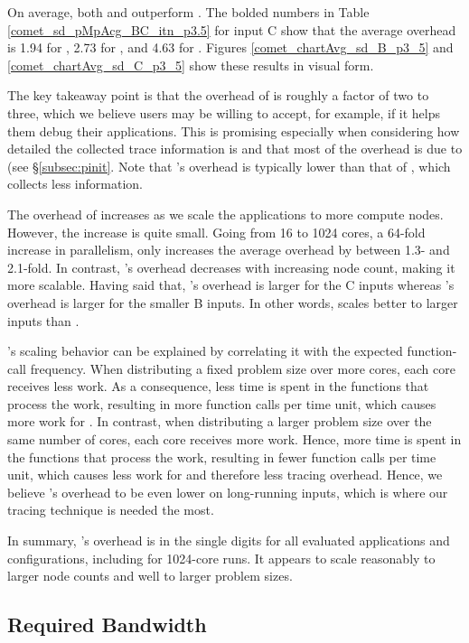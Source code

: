 On average, both \parlotm and \parlota outperform \callgrind. The bolded numbers in Table \ref{comet_sd_pMpAcg_BC_itn_p3.5} for input C show that the average overhead is 1.94 for \parlotm, 2.73 for \parlota, and 4.63 for \callgrind. Figures \ref{comet_chartAvg_sd_B_p3_5} and \ref{comet_chartAvg_sd_C_p3_5} show these results in visual form.


The key takeaway point is that the overhead of \parlot is roughly a factor of two to three, which we believe users may be willing to accept, for example, if it helps them debug their applications. This is promising especially when considering how detailed the collected trace information is and that most of the overhead is due to \pin (see \S\ref{subsec:pinit}. Note that \parlot 's overhead is typically lower than that of \callgrind, which collects less information.

The overhead of \parlot increases as we scale the applications to more compute nodes. However, the increase is quite small. Going from 16 to 1024 cores, a 64-fold increase in parallelism, only increases the average overhead by between 1.3- and 2.1-fold. In contrast, \callgrind 's overhead decreases with increasing node count, making it more scalable. Having said that, \callgrind 's overhead is larger for the C inputs whereas \parlot 's overhead is larger for the smaller B inputs. In other words, \parlot scales better to larger inputs than \callgrind.

\parlot 's scaling behavior can be explained by correlating it with the expected function-call frequency. When distributing a fixed problem size over more cores, each core receives less work. As a consequence, less time is spent in the functions that process the work, resulting in more function calls per time unit, which causes more work for \parlot. In contrast, when distributing a larger problem size over the same number of cores, each core receives more work. Hence, more time is spent in the functions that process the work, resulting in fewer function calls per time unit, which causes less work for \parlot and therefore less tracing overhead. Hence, we believe \parlot 's overhead to be even lower on long-running inputs, which is where our tracing technique is needed the most.


In summary, \parlot 's overhead is in the single digits for all evaluated applications and configurations, including for 1024-core runs. It appears to scale reasonably to larger node counts and well to larger problem sizes.
  
\subsection{Required Bandwidth}
\label{subsec:lowbw}

